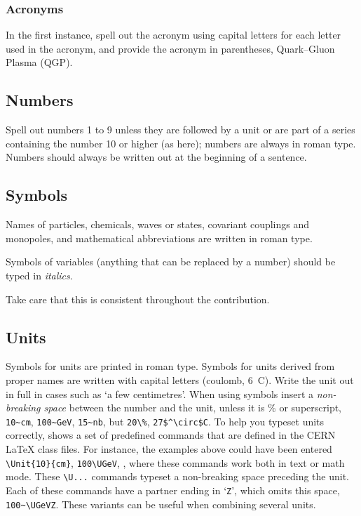\documentclass{cernrep}
\begin{document}
\subsubsection{Acronyms}

In the first instance, spell out the acronym using capital letters for
each letter used in the acronym, and provide the acronym in
parentheses, \eg Quark--Gluon Plasma (QGP).

\subsection{Numbers}

Spell out numbers 1 to 9 unless they are followed by a unit or are
part of a series containing the number 10 or higher (as here); numbers
are always in roman type. Numbers should always be written out at the
beginning of a sentence.

\subsection{Symbols}

Names of particles, chemicals, waves or states, covariant couplings
and monopoles, and mathematical abbreviations are written in roman
type.

Symbols of variables (\ie anything that can be replaced by a number)
should be typed in \emph{italics}.

Take care that this is consistent throughout the contribution.

\subsection{Units}

Symbols for units are printed in roman type. Symbols for units derived
from proper names are written with capital letters (\eg coulomb, 6~C).
Write the unit out in full in cases such as `a few centimetres'.  When
using symbols insert a \emph{non-breaking space} between the number
and the unit, unless it is $\%$ or superscript, \eg \verb!10~cm!,
\verb!100~GeV!, \verb!15~nb!, but \verb!20\%!, \verb!27$^\circ$C!. To
help you typeset units correctly,  shows a set of
predefined commands that are defined in the CERN \LaTeX{} class files.
For instance, the examples above could have been entered
\verb!\Unit{10}{cm}!, \verb!100\UGeV!, \etc, where these commands work
both in text or math mode. These \verb!\U...! commands typeset a
non-breaking space preceding the unit.  Each of these commands have a
partner ending in `\texttt{Z}', which omits this space, \eg
\verb!100~\UGeVZ!. These variants can be useful when combining several
units.
\end{document}
